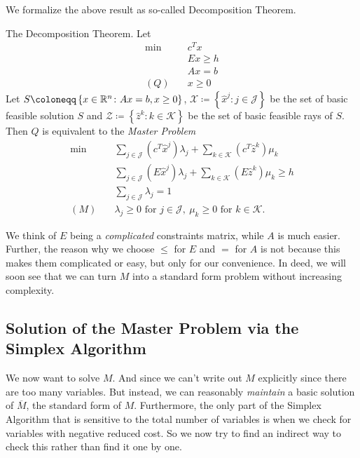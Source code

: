 We formalize the above result as so-called Decomposition Theorem.
\begin{theorem}
	\label{Decomposition Theorem}
	The Decomposition Theorem. Let
	\begin{align*}
		\min~    & c^Tx      \\
		         & Ex \geq h \\
		         & Ax = b    \\
		(Q)\quad & x\geq 0
	\end{align*}
	Let \(S\coloneqq \left\{ x\in\mathbb{\MakeUppercase{R}}^n\colon Ax = b, x\geq 0 \right\}\), \(\mathcal{X} \coloneqq \left\{\hat{x}^j\colon j\in\mathcal{J} \right\}\) be
	the set of basic feasible solution \(S\) and \(\mathcal{Z} \coloneqq \left\{\hat{z}^k\colon k\in\mathcal{K} \right\}\) be the set of basic feasible
	rays of \(S\). Then \(Q\) is equivalent to the \emph{Master Problem }
	\begin{align*}
		\min~    & \sum\limits_{j\in\mathcal{J}}\left(c^T\hat{x}^j\right)\lambda_{j} + \sum\limits_{k\in\mathcal{K}}\left(c^{T} \hat{z}^k  \right)\mu_k \\
		         & \sum\limits_{j\in\mathcal{J}}\left(E\hat{x}^j\right)\lambda_{j} + \sum\limits_{k\in\mathcal{K}}\left(E \hat{z}^k \right)\mu_k \geq h \\
		         & \sum\limits_{j\in\mathcal{J}}\lambda_{j} = 1                                                                                         \\
		(M)\quad & \lambda_{j}\geq 0 \text{ for }j\in\mathcal{J},\ \mu_k\geq 0 \text{ for }k\in\mathcal{K}.
	\end{align*}
\end{theorem}

\begin{remark}
	We think of \(E\) being a \emph{complicated} constraints matrix, while \(A\) is much easier. Further, the reason why we choose \(\leq \) for \(E\) and \(=\) for \(A\) is not because
	this makes them complicated or easy, but only for our convenience. In deed, we will soon see that we can turn \(M\) into a standard form problem without increasing complexity.
\end{remark}

\subsection{Solution of the Master Problem via the Simplex Algorithm}
We now want to solve \(M\). And since we can't write out \(M\) explicitly since there are too many variables. But instead, we can reasonably
\emph{maintain} a basic solution of \(\overline{M}\), the standard form of \(M\). Furthermore, the only part of the Simplex Algorithm that is
sensitive to the total number of variables is when we check for variables with negative reduced cost. So we now try to find an indirect way to
check this rather than find it one by one.


